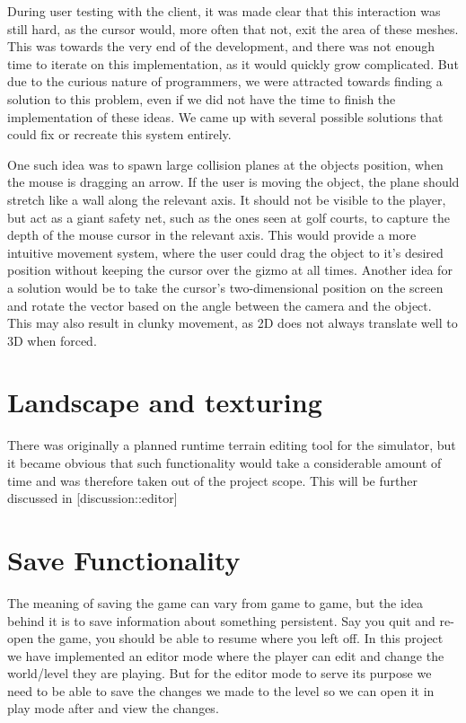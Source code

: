 
During user testing with the client, it was made clear that this interaction was still hard, as the cursor would, more often that not, exit the area of these meshes. This was towards the very end of the development, and there was not enough time to iterate on this implementation, as it would quickly grow complicated. But due to the curious nature of programmers, we were attracted towards finding a solution to this problem, even if we did not have the time to finish the implementation of these ideas. We came up with several possible solutions that could fix or recreate this system entirely.


One such idea was to spawn large collision planes at the objects position, when the mouse is dragging an arrow. If the user is moving the object, the plane should stretch like a wall along the relevant axis. It should not be visible to the player, but act as a giant safety net, such as the ones seen at golf courts, to capture the depth of the mouse cursor in the relevant axis. This would provide a more intuitive movement system, where the user could drag the object to it's desired position without keeping the cursor over the gizmo at all times. Another idea for a solution would be to take the cursor's two-dimensional position on the screen and rotate the vector based on the angle between the camera and the object. This may also result in clunky movement, as 2D does not always translate well to 3D when forced.

\section{Landscape and texturing}


There was originally a planned runtime terrain editing tool for the simulator, but it became obvious that such functionality would take a considerable amount of time and was therefore taken out of the project scope. This will be further discussed in [discussion::editor] 

\section{Save Functionality}
The meaning of saving the game can vary from game to game, but the idea behind it is to save information about something persistent. Say you quit and re-open the game, you should be able to resume where you left off. In this project we have implemented an editor mode where the player can edit and change the world/level they are playing. But for the editor mode to serve its purpose we need to be able to save the changes we made to the level so we can open it in play mode after and view the changes. 


